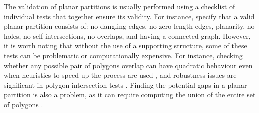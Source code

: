 The validation of planar partitions is usually performed using a checklist of individual tests that together ensure its validity.
For instance, \citet{Plumer97} specify that a valid planar partition consists of: no dangling edges, no zero-length edges, planarity, no holes, no self-intersections, no overlaps, and having a connected graph.
However, it is worth noting that without the use of a supporting structure, some of these tests can be problematic or computationally expensive.
For instance, checking whether any possible pair of polygons overlap can have quadratic behaviour even when heuristics to speed up the process are used \citep{Badawy99,Kirkpatrick00}, and robustness issues are significant in polygon intersection tests \citep{Hoffmann88}.
Finding the potential gaps in a planar partition is also a problem, as it can require computing the union of the entire set of polygons \citep{Margalit89,Rivero00}.

